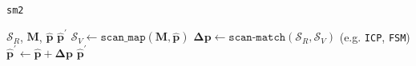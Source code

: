\begin{algorithm}
  \caption{\texttt{sm2}}
  \begin{spacing}{1.2}
  \begin{algorithmic}[1]
    \REQUIRE $\mathcal{S}_R$, $\bm{M}$, $\hat{\bm{p}}$
    \ENSURE $\hat{\bm{p}}^\prime$
    \STATE $\mathcal{S}_V \leftarrow \texttt{scan\_map}(\bm{M}, \hat{\bm{p}})$
    \STATE $\bm{\Delta p} \leftarrow \texttt{scan-match}(\mathcal{S}_R,\mathcal{S}_V)$ \hfill \small (e.g. \texttt{ICP}\cite{kissicp}, \texttt{FSM}\cite{fsm})
    \STATE $\hat{\bm{p}}^\prime \leftarrow \hat{\bm{p}} + \bm{\Delta p}$
    \RETURN $\hat{\bm{p}}^\prime$
  \end{algorithmic}
  \end{spacing}
  \label{alg:algorithm_sm2}
\end{algorithm}

